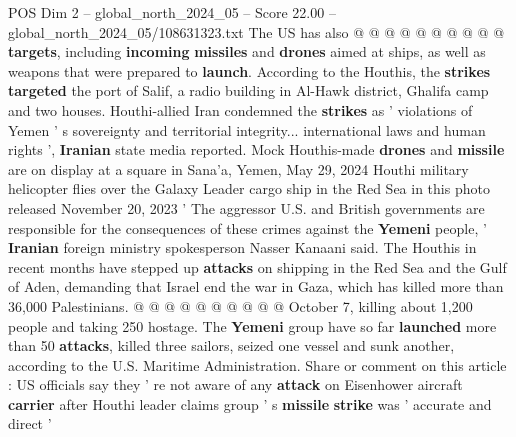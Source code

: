 \begin{textsample}{POS Dim 2 – global\_north\_2024\_05 – Score 22.00 – global\_north\_2024\_05/108631323.txt}
The US has also @ @ @ @ @ @ @ @ @ @ \textbf{targets}, including \textbf{incoming} \textbf{missiles} and \textbf{drones} aimed at ships, as well as weapons that were prepared to \textbf{launch}.
According to the Houthis, the \textbf{strikes} \textbf{targeted} the port of Salif, a radio building in Al-Hawk district, Ghalifa camp and two houses.
Houthi-allied Iran condemned the \textbf{strikes} as ' violations of Yemen ' s sovereignty and territorial integrity... international laws and human rights ', \textbf{Iranian} state media reported.
Mock Houthis-made \textbf{drones} and \textbf{missile} are on display at a square in Sana'a, Yemen, May 29, 2024 Houthi military helicopter flies over the Galaxy Leader cargo ship in the Red Sea in this photo released November 20, 2023 ' The aggressor U.S. and British governments are responsible for the consequences of these crimes against the \textbf{Yemeni} people, ' \textbf{Iranian} foreign ministry spokesperson Nasser Kanaani said.
The Houthis in recent months have stepped up \textbf{attacks} on shipping in the Red Sea and the Gulf of Aden, demanding that Israel end the war in Gaza, which has killed more than 36,000 Palestinians. @ @ @ @ @ @ @ @ @ @ October 7, killing about 1,200 people and taking 250 hostage.
The \textbf{Yemeni} group have so far \textbf{launched} more than 50 \textbf{attacks}, killed three sailors, seized one vessel and sunk another, according to the U.S.
Maritime Administration.
Share or comment on this article : US officials say they ' re not aware of any \textbf{attack} on Eisenhower aircraft \textbf{carrier} after Houthi leader claims group ' s \textbf{missile} \textbf{strike} was ' accurate and direct '

\end{textsample}
